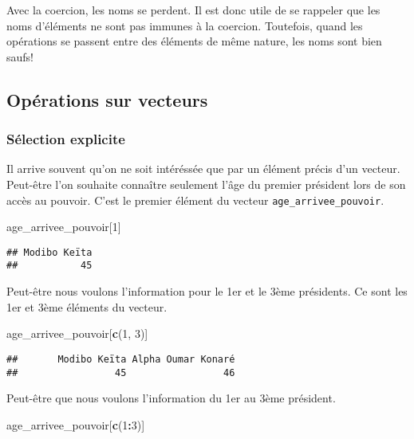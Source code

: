 \documentclass[]{book}
\newenvironment{Shaded}{\begin{snugshade}}{\end{snugshade}}
\newcommand{\KeywordTok}[1]{\textcolor[rgb]{0.13,0.29,0.53}{\textbf{#1}}}
\newcommand{\DecValTok}[1]{\textcolor[rgb]{0.00,0.00,0.81}{#1}}
\newcommand{\OperatorTok}[1]{\textcolor[rgb]{0.81,0.36,0.00}{\textbf{#1}}}
\newcommand{\NormalTok}[1]{#1}
\begin{document}
Avec la coercion, les noms se perdent. Il est donc utile de se rappeler
que les noms d'éléments ne sont pas immunes à la coercion. Toutefois,
quand les opérations se passent entre des éléments de même nature, les
noms sont bien saufs!

\subsection{Opérations sur vecteurs}\label{operations-sur-vecteurs}

\subsubsection{Sélection explicite}\label{selection-explicite}

Il arrive souvent qu'on ne soit intéréssée que par un élément précis
d'un vecteur. Peut-être l'on souhaite connaître seulement l'âge du
premier président lors de son accès au pouvoir. C'est le premier élément
du vecteur \texttt{age\_arrivee\_pouvoir}.

\begin{Shaded}
\begin{Highlighting}[]
\NormalTok{age_arrivee_pouvoir[}\DecValTok{1}\NormalTok{]}
\end{Highlighting}
\end{Shaded}

\begin{verbatim}
## Modibo Keïta 
##           45
\end{verbatim}

Peut-être nous voulons l'information pour le 1er et le 3ème présidents.
Ce sont les 1er et 3ème éléments du vecteur.

\begin{Shaded}
\begin{Highlighting}[]
\NormalTok{age_arrivee_pouvoir[}\KeywordTok{c}\NormalTok{(}\DecValTok{1}\NormalTok{, }\DecValTok{3}\NormalTok{)]}
\end{Highlighting}
\end{Shaded}

\begin{verbatim}
##       Modibo Keïta Alpha Oumar Konaré 
##                 45                 46
\end{verbatim}

Peut-être que nous voulons l'information du 1er au 3ème président.

\begin{Shaded}
\begin{Highlighting}[]
\NormalTok{age_arrivee_pouvoir[}\KeywordTok{c}\NormalTok{(}\DecValTok{1}\OperatorTok{:}\DecValTok{3}\NormalTok{)]}
\end{Highlighting}
\end{Shaded}
\end{document}
